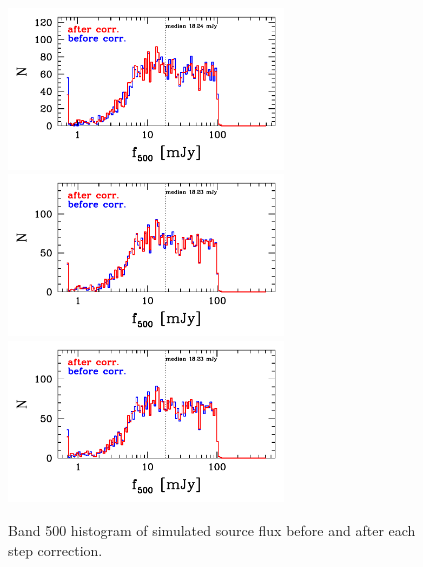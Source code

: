 \documentclass[11pt,a4paper]{article}
\begin{document}
\begin{figure}[H]
	\caption{
		Band 500 histogram of simulated source flux before and after each step correction. 
	}
	\includegraphics[width=0.65\textwidth]{galsim_500_hist_flux_1}
	\includegraphics[width=0.65\textwidth]{galsim_500_hist_flux_2}
	\includegraphics[width=0.65\textwidth]{galsim_500_hist_flux_3}
\end{figure}
\end{document}
